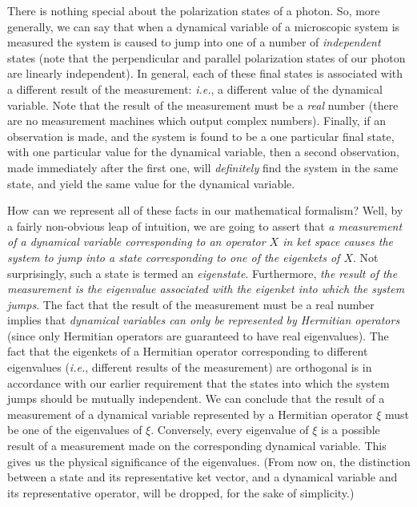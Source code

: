 There is nothing special about the polarization states of a photon. So, more
generally, we can say that when  a dynamical variable of
a microscopic system is measured the  system is caused to jump into one of a number of
{\em independent} states (note that the perpendicular and parallel polarization
states of our photon are linearly independent). In general, each of these final states
is associated with a different result of the measurement:
{\em i.e.}, a different value of the dynamical variable. Note that the result
of the measurement must be a {\em real} number (there are no measurement machines
which output complex numbers). Finally, if an observation is made, and the system
is found to be a one particular final state, with one particular value for the
dynamical variable, then a second observation, made immediately after the first one,
will {\em definitely} find the system in the same state, and yield the same
value for the dynamical variable.

How can we represent all of these facts in our mathematical formalism? Well,
by a fairly non-obvious leap of intuition, we are going to assert that
{\em a measurement of a dynamical variable corresponding to an operator $X$ in ket
space causes the system to jump into a state corresponding to one of the
eigenkets of $X$}. Not surprisingly, such a state is termed an {\em eigenstate}. 
Furthermore,
 {\em the result of the measurement is the eigenvalue associated with the eigenket
into which the system jumps}. The fact that the result of the measurement must
be a real number implies that {\em dynamical variables can only be represented
by Hermitian operators} (since only Hermitian operators are guaranteed to have
real eigenvalues). The fact that the eigenkets of a Hermitian operator
corresponding to different eigenvalues ({\em i.e.}, different results of the
measurement) are orthogonal is in accordance with our earlier requirement that the
states into which the system jumps should be mutually independent. 
We can conclude that the result of  a measurement of a dynamical variable
represented by a Hermitian operator $\xi$ must be one of the eigenvalues
of $\xi$. Conversely, every eigenvalue of $\xi$ is a possible result
of a measurement made on the corresponding dynamical variable. This gives
us the physical significance of the eigenvalues. (From now on, the distinction
between a state and its representative ket vector, and a dynamical variable
and its representative operator, will be dropped, for the sake of
simplicity.)

